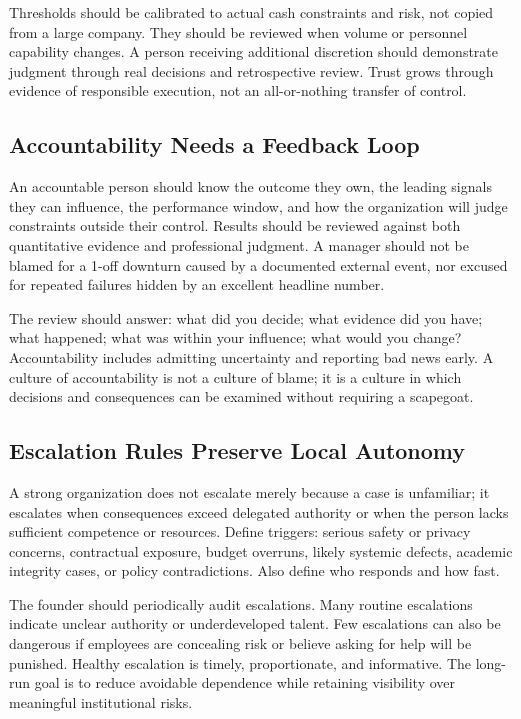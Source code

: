 Thresholds should be calibrated to actual cash constraints and risk, not copied from a large company. They should be reviewed when volume or personnel capability changes. A person receiving additional discretion should demonstrate judgment through real decisions and retrospective review. Trust grows through evidence of responsible execution, not an all-or-nothing transfer of control.

\subsection{Accountability Needs a Feedback Loop}
\label{sec:accountability_feedback_loop}

An accountable person should know the outcome they own, the leading signals they can influence, the performance window, and how the organization will judge constraints outside their control. Results should be reviewed against both quantitative evidence and professional judgment. A manager should not be blamed for a 1-off downturn caused by a documented external event, nor excused for repeated failures hidden by an excellent headline number.

The review should answer: what did you decide; what evidence did you have; what happened; what was within your influence; what would you change? Accountability includes admitting uncertainty and reporting bad news early. A culture of accountability is not a culture of blame; it is a culture in which decisions and consequences can be examined without requiring a scapegoat.

\subsection{Escalation Rules Preserve Local Autonomy}
\label{sec:escalation_rules_local_autonomy}

A strong organization does not escalate merely because a case is unfamiliar; it escalates when consequences exceed delegated authority or when the person lacks sufficient competence or resources. Define triggers: serious safety or privacy concerns, contractual exposure, budget overruns, likely systemic defects, academic integrity cases, or policy contradictions. Also define who responds and how fast.

The founder should periodically audit escalations. Many routine escalations indicate unclear authority or underdeveloped talent. Few escalations can also be dangerous if employees are concealing risk or believe asking for help will be punished. Healthy escalation is timely, proportionate, and informative. The long-run goal is to reduce avoidable dependence while retaining visibility over meaningful institutional risks.

